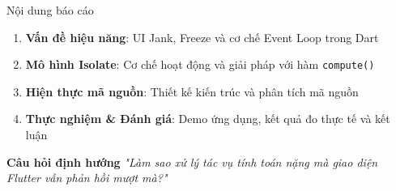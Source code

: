 \documentclass[aspectratio=169,11pt]{beamer}
\begin{document}
\begin{frame}{Nội dung báo cáo}
  \vspace{0.2cm}
  \begin{enumerate}
    \setlength{\itemsep}{0.32cm}
    \item \textbf{Vấn đề hiệu năng}: UI Jank, Freeze và cơ chế Event Loop trong Dart
    \item \textbf{Mô hình Isolate}: Cơ chế hoạt động và giải pháp với hàm \texttt{compute()}
    \item \textbf{Hiện thực mã nguồn}: Thiết kế kiến trúc và phân tích mã nguồn
    \item \textbf{Thực nghiệm \& Đánh giá}: Demo ứng dụng, kết quả đo thực tế và kết luận
  \end{enumerate}

  \vspace{0.5cm}
  \begin{block}{\scriptsize\bfseries Câu hỏi định hướng}
    \scriptsize\centering \textit{"Làm sao xử lý tác vụ tính toán nặng mà giao diện Flutter vẫn phản hồi mượt mà?"}
  \end{block}
\end{frame}

\end{document}
